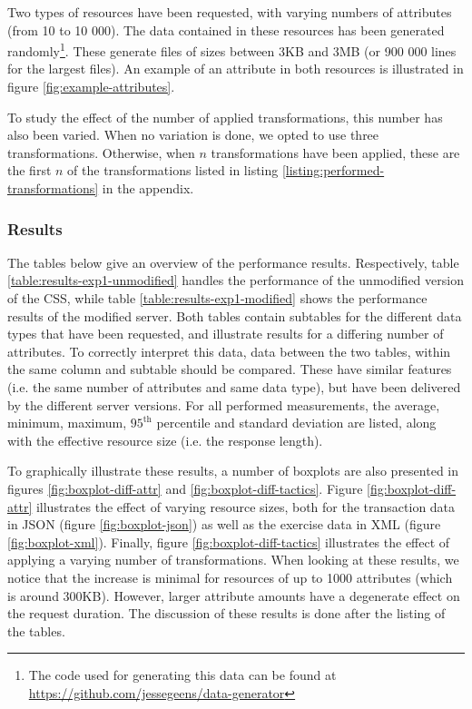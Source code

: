 Two types of resources have been requested, with varying numbers of attributes (from 10 to 10 000). The data contained in these resources has been generated randomly\footnote{The code used for generating this data can be found at \url{https://github.com/jessegeens/data-generator}}. These generate files of sizes between 3KB and 3MB (or 900 000 lines for the largest files). An example of an attribute in both resources is illustrated in figure \ref{fig:example-attributes}.

To study the effect of the number of applied transformations, this number has also been varied. When no variation is done, we opted to use three transformations. Otherwise, when $n$ transformations have been applied, these are the first $n$ of the transformations listed in listing \ref{listing:performed-transformations} in the appendix.

\subsubsection{Results}
The tables below give an overview of the performance results. Respectively, table \ref{table:results-exp1-unmodified} handles the performance of the unmodified version of the \gls{CSS}, while table \ref{table:results-exp1-modified} shows the performance results of the modified server. Both tables contain subtables for the different data types that have been requested, and illustrate results for a differing number of attributes. 
To correctly interpret this data, data between the two tables, within the same column and subtable should be compared. These have similar features (i.e. the same number of attributes and same data type), but have been delivered by the different server versions. For all performed measurements, the average, minimum, maximum, $95^{\text{th}}$ percentile and standard deviation are listed, along with the effective resource size (i.e. the response length).

To graphically illustrate these results, a number of boxplots are also presented in figures \ref{fig:boxplot-diff-attr} and \ref{fig:boxplot-diff-tactics}. Figure \ref{fig:boxplot-diff-attr} illustrates the effect of varying resource sizes, both for the transaction data in JSON (figure \ref{fig:boxplot-json}) as well as the exercise data in XML (figure \ref{fig:boxplot-xml}). Finally, figure \ref{fig:boxplot-diff-tactics} illustrates the effect of applying a varying number of transformations. When looking at these results, we notice that the increase is minimal for resources of up to 1000 attributes (which is around 300KB). However, larger attribute amounts have a degenerate effect on the request duration. The discussion of these results is done after the listing of the tables.

